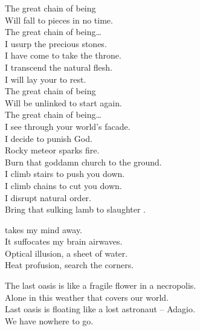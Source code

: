 The great chain of being \\
Will fall to pieces in no time. \\

The great chain of being… \\

I usurp the precious stones. \\
I have come to take the throne. \\
I transcend the natural flesh. \\
I will lay your  to rest. \\

The great chain of being \\
Will be unlinked to start again. \\

The great chain of being… \\

I see through your world's facade. \\
I decide to punish God. \\
Rocky meteor sparks fire. \\
Burn that goddamn church to the ground. \\

I climb stairs to push you down. \\
I climb chains to cut you down. \\
I disrupt natural order. \\
Bring that sulking lamb to slaughter . \\





 takes my mind away. \\
It suffocates my brain airwaves. \\

Optical illusion, a sheet of water. \\
Heat profusion, search the corners. \\


The last oasis is like a fragile flower in a necropolis. \\
Alone in this weather that covers our world. \\
Last oasis is floating like a lost astronaut -- Adagio. \\
We have nowhere to go. \\

